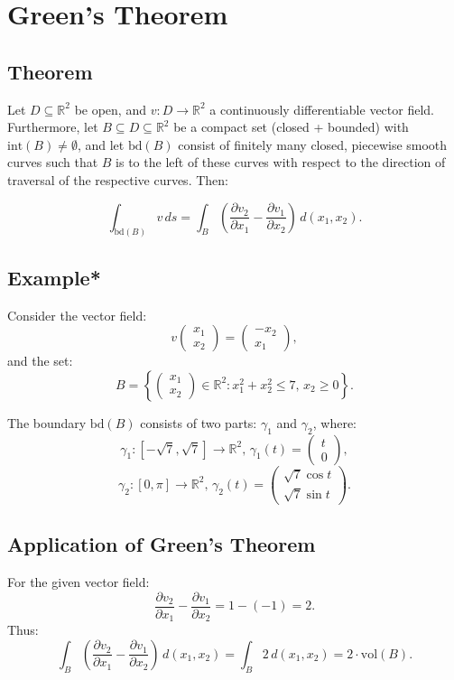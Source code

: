 \documentclass{article}
\begin{document}
\section{Green's Theorem}
\subsection{Theorem}
Let $D \subseteq \mathbb{R}^2$ be open, and $v: D \to \mathbb{R}^2$ a continuously differentiable vector field. Furthermore, let $B \subseteq D \subseteq \mathbb{R}^2$ be a compact set (closed + bounded) with $\text{int}(B) \neq \emptyset$, and let $\text{bd}(B)$ consist of finitely many closed, piecewise smooth curves such that $B$ is to the left of these curves with respect to the direction of traversal of the respective curves. Then:

\[
\int_{\text{bd}(B)} v \, ds = \int_{B} \left( \frac{\partial v_2}{\partial x_1} - \frac{\partial v_1}{\partial x_2} \right) \, d(x_1, x_2).
\]

\subsection{Example*}
Consider the vector field:
\[
v \begin{pmatrix} x_1 \\ x_2 \end{pmatrix} = \begin{pmatrix} -x_2 \\ x_1 \end{pmatrix},
\]
and the set:
\[
B = \left\{ \begin{pmatrix} x_1 \\ x_2 \end{pmatrix} \in \mathbb{R}^2 : x_1^2 + x_2^2 \leq 7, \, x_2 \geq 0 \right\}.
\]

The boundary $\text{bd}(B)$ consists of two parts: $\gamma_1$ and $\gamma_2$, where:
\[
\gamma_1 : [-\sqrt{7}, \sqrt{7}] \rightarrow \mathbb{R}^2, \, \gamma_1(t) = \begin{pmatrix} t \\ 0 \end{pmatrix},
\]
\[
\gamma_2 : [0, \pi] \rightarrow \mathbb{R}^2, \, \gamma_2(t) = \begin{pmatrix} \sqrt{7} \cos t \\ \sqrt{7} \sin t \end{pmatrix}.
\]

\subsection{Application of Green's Theorem}
For the given vector field:
\[
\frac{\partial v_2}{\partial x_1} - \frac{\partial v_1}{\partial x_2} = 1 - (-1) = 2.
\]
Thus:
\[
\int_{B} \left( \frac{\partial v_2}{\partial x_1} - \frac{\partial v_1}{\partial x_2} \right) \, d(x_1, x_2) = \int_{B} 2 \, d(x_1, x_2) = 2 \cdot \text{vol}(B).
\]
\end{document}
